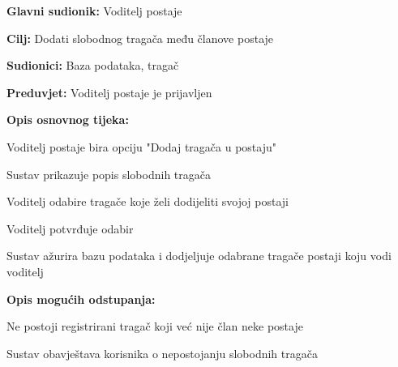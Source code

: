 					\noindent {}
					\begin{packed_item}
						
						\item \textbf{Glavni sudionik:} Voditelj postaje
						\item \textbf{Cilj:} Dodati slobodnog tragača među članove postaje
						\item \textbf{Sudionici:} Baza podataka, tragač
						\item \textbf{Preduvjet:} Voditelj postaje je prijavljen
						\item \textbf{Opis osnovnog tijeka:}
						
						\item[] \begin{packed_enum}
							
							\item Voditelj postaje bira opciju "Dodaj tragača u postaju" 
							\item Sustav prikazuje popis slobodnih tragača
							\item Voditelj odabire tragače koje želi dodijeliti svojoj postaji 
							\item Voditelj potvrđuje odabir 
							\item Sustav ažurira bazu podataka i dodjeljuje odabrane tragače postaji koju vodi voditelj
						\end{packed_enum}
						
						\item  \textbf{Opis mogućih odstupanja:}
						
						\item[] \begin{packed_item}
							
							\item[2.a] Ne postoji registrirani tragač koji već nije član neke postaje
							\item[] \begin{packed_enum}
								
								\item Sustav obavještava korisnika o nepostojanju slobodnih tragača
								
							\end{packed_enum}
							
						\end{packed_item}
					\end{packed_item}
					
					\eject
					
